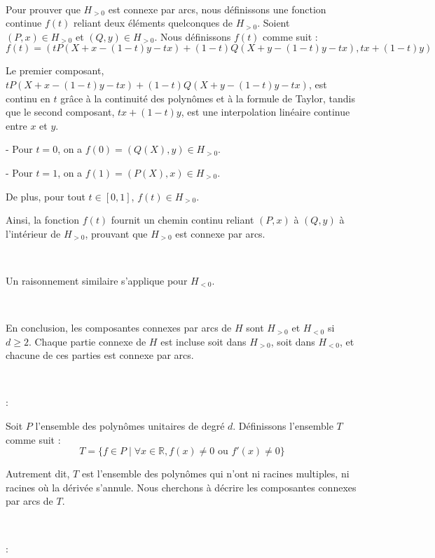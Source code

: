 \


Pour prouver que $H_{> 0}$ est connexe par arcs, nous d{\'e}finissons une
fonction continue $f (t)$ reliant deux {\'e}l{\'e}ments quelconques de $H_{>
0}$. Soient $(P, x) \in H_{> 0}$ et $(Q, y) \in H_{> 0}$. Nous d{\'e}finissons
$f (t)$ comme suit :
\[ f (t) = (tP (X + x - (1 - t) y - tx) + (1 - t) Q (X + y - (1 - t) y - tx),
   tx + (1 - t) y) \]


Le premier composant, $tP (X + x - (1 - t) y - tx) + (1 - t) Q (X + y - (1 -
t) y - tx)$, est continu en $t$ gr{\^a}ce {\`a} la continuit{\'e} des
polyn{\^o}mes et {\`a} la formule de Taylor, tandis que le second composant,
$tx + (1 - t) y$, est une interpolation lin{\'e}aire continue entre $x$ et
$y$.

- Pour $t = 0$, on a $f (0) = (Q (X), y) \in H_{> 0}$.

- Pour $t = 1$, on a $f (1) = (P (X), x) \in H_{> 0}$.

De plus, pour tout $t \in [0, 1]$, $f (t) \in H_{> 0}$.

Ainsi, la fonction $f (t)$ fournit un chemin continu reliant $(P, x)$ {\`a}
$(Q, y)$ {\`a} l'int{\'e}rieur de $H_{> 0}$, prouvant que $H_{> 0}$ est
connexe par arcs.

\


Un raisonnement similaire s'applique pour $H_{< 0}$.

\

En conclusion, les composantes connexes par arcs de $H$ sont $H_{> 0}$ et
$H_{< 0}$ si $d \geq 2$. Chaque partie connexe de $H$ est incluse soit dans
$H_{> 0}$, soit dans $H_{< 0}$, et chacune de ces parties est connexe par
arcs.

\

 :

Soit $P$ l'ensemble des polyn{\^o}mes unitaires de degr{\'e} $d$.
D{\'e}finissons l'ensemble $T$ comme suit :
\[ T =\{f \in P \mid \forall x \in \mathbb{R}, f (x) \neq 0 \text{ ou } f' (x)
   \neq 0\} \]


Autrement dit, $T$ est l'ensemble des polyn{\^o}mes qui n'ont ni racines
multiples, ni racines o{\`u} la d{\'e}riv{\'e}e s'annule. Nous cherchons {\`a}
d{\'e}crire les composantes connexes par arcs de $T$.

\

 :

